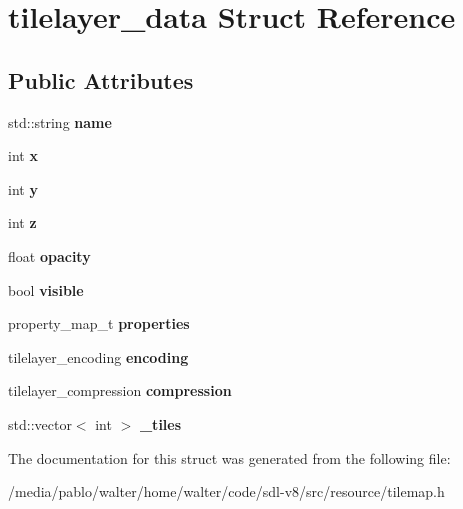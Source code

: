 \hypertarget{structtilelayer__data}{}\section{tilelayer\+\_\+data Struct Reference}
\label{structtilelayer__data}
\subsection*{Public Attributes}
\begin{DoxyCompactItemize}
\item 
\mbox{\label{structtilelayer__data_a055db14923a1ff8fd4f8627afdd35be3}} 
std\+::string {\bfseries name}
\item 
\mbox{\label{structtilelayer__data_a9ff7edef09e08d0b9946a3b1ffa924bc}} 
int {\bfseries x}
\item 
\mbox{\label{structtilelayer__data_af52962e232e5a95c6529ac17b594660e}} 
int {\bfseries y}
\item 
\mbox{\label{structtilelayer__data_a8adcc456ba1a590477f6e7be8aede88b}} 
int {\bfseries z}
\item 
\mbox{\label{structtilelayer__data_a932f1a4d6733cd9a422e75826b316835}} 
float {\bfseries opacity}
\item 
\mbox{\label{structtilelayer__data_a01a570f5731b12bf6aa23fdb3d60f841}} 
bool {\bfseries visible}
\item 
\mbox{\label{structtilelayer__data_ade5cf39a45496b29b92564cd666420f1}} 
property\+\_\+map\+\_\+t {\bfseries properties}
\item 
\mbox{\label{structtilelayer__data_ae13a5dd9e6f49fe716baa082e83fdbea}} 
tilelayer\+\_\+encoding {\bfseries encoding}
\item 
\mbox{\label{structtilelayer__data_a63b06558ead59b0baff617e4d17b075e}} 
tilelayer\+\_\+compression {\bfseries compression}
\item 
\mbox{\label{structtilelayer__data_a284da93311441a8a1832d771657d355c}} 
std\+::vector$<$ int $>$ {\bfseries \+\_\+tiles}
\end{DoxyCompactItemize}


The documentation for this struct was generated from the following file\+:\begin{DoxyCompactItemize}
\item 
/media/pablo/walter/home/walter/code/sdl-\/v8/src/resource/tilemap.\+h\end{DoxyCompactItemize}
